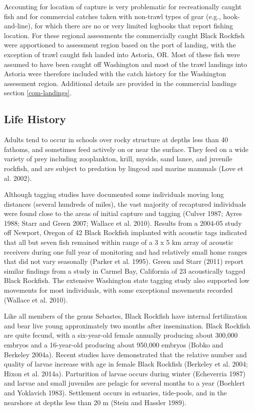 \documentclass[11pt,
  letterpaper,
]{article}
\begin{document}
Accounting for location of capture is very problematic for recreationally caught fish and for commercial catches taken with non-trawl types of gear (e.g., hook-and-line), for which there are no or very limited logbooks that report fishing location. For these regional assessments the commercially caught Black Rockfish were apportioned to assessment region based on the port of landing, with the exception of trawl caught fish landed into Astoria, OR. Most of these fish were assumed to have been caught off Washington and most of the trawl landings into Astoria were therefore included with the catch history for the Washington assessment region. Additional details are provided in the commercial landings section \ref{com-landings}.

\hypertarget{life-history}{%
\subsection{Life History}\label{life-history}}

Adults tend to occur in schools over rocky structure at depths less than 40 fathoms, and sometimes feed actively on or near the surface. They feed on a wide variety of prey including zooplankton, krill, mysids, sand lance, and juvenile rockfish, and are subject to predation by lingcod and marine mammals (Love et al. 2002).

Although tagging studies have documented some individuals moving long distances (several hundreds of miles), the vast majority of recaptured individuals were found close to the areas of initial capture and tagging (Culver 1987; Ayres 1988; Starr and Green 2007; Wallace et al. 2010). Results from a 2004-05 study off Newport, Oregon of 42 Black Rockfish implanted with acoustic tags indicated that all but seven fish remained within range of a 3 x 5 km array of acoustic receivers during one full year of monitoring and had relatively small home ranges that did not vary seasonally (Parker et al. 1995). Green and Starr (2011) report similar findings from a study in Carmel Bay, California of 23 acoustically tagged Black Rockfish. The extensive Washington state tagging study also supported low movements for most individuals, with some exceptional movements recorded (Wallace et al. 2010).

Like all members of the genus Sebastes, Black Rockfish have internal fertilization and bear live young approximately two months after insemination. Black Rockfish are quite fecund, with a six-year-old female annually producing about 300,000 embryos and a 16-year-old producing about 950,000 embryos (Bobko and Berkeley 2004a). Recent studies have demonstrated that the relative number and quality of larvae increase with age in female Black Rockfish (Berkeley et al. 2004; Hixon et al. 2014a). Parturition of larvae occurs during winter (Echeverria 1987) and larvae and small juveniles are pelagic for several months to a year (Boehlert and Yoklavich 1983). Settlement occurs in estuaries, tide-pools, and in the nearshore at depths less than 20 m (Stein and Hassler 1989).
\end{document}
